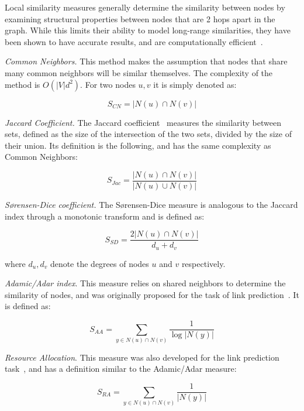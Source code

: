 Local similarity measures generally determine the similarity between
nodes by examining structural properties between nodes that
are 2 hops apart in the graph. While this limits their ability to model long-range
similarities, they have been shown to have accurate results, and are computationally
efficient~\cite{link-prediction-survey}.


\emph{Common Neighbors.} This method makes the assumption that nodes that
share many common neighbors will be similar themselves. The complexity of
the method is $O(|V|d^2)$. For two nodes $u, v$
it is simply denoted as:

\begin{equation}
	S_{CN} = |N(u) \cap N(v)|
\end{equation}


\emph{Jaccard Coefficient.} The Jaccard coefficient~\cite{Jaccard1912} measures the similarity between
sets, defined as the size of the intersection of the two sets, divided by the size of their
union. Its definition is the following, and has the same complexity as Common Neighbors:

\begin{equation}
	S_{Jac} = \frac{|N(u) \cap N(v)|}{|N(u) \cup N(v)|}
\end{equation}

\emph{S{\o}rensen-Dice coefficient.} The S{\o}rensen-Dice measure \cite{Dice45,Sorensen48} is
analogous to the Jaccard index through a monotonic transform and is defined as:

\begin{equation}
	S_{SD} = \frac{2|N(u) \cap N(v)|}{d_u + d_v}
\end{equation}

\noindent
where $d_u, d_v$ denote the degrees of nodes $u$ and $v$ respectively.

\emph{Adamic/Adar index}. This measure relies on shared neighbors to determine
the similarity of nodes, and was originally proposed for the task of link
prediction~\cite{adamic-adar}. It is defined as:

\begin{equation}
	S_{AA} = \sum_{y \in N(u) \cap N(v)}{\frac{1}{\log{|N(y)|}}}
\end{equation}

\emph{Resource Allocation}. This measure was also developed for the
link prediction task~\cite{resource-allocation-sim}, and has a definition
similar to the Adamic/Adar measure:

\begin{equation}
S_{RA} = \sum_{y \in N(u) \cap N(v)}{\frac{1}{|N(y)|}}
\end{equation}

